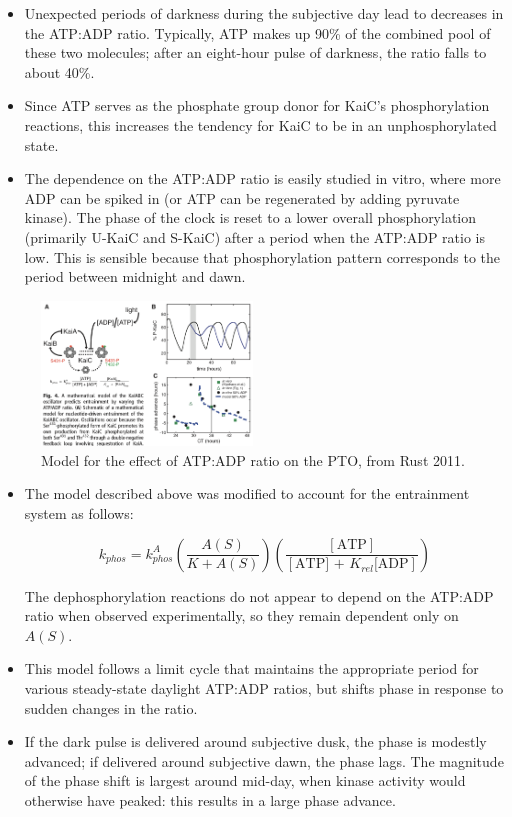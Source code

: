 \documentclass{article}
\begin{document}
\begin{itemize}
\item Unexpected periods of darkness during the subjective day lead to decreases in the ATP:ADP ratio. Typically, ATP makes up 90\% of the combined pool of these two molecules; after an eight-hour pulse of darkness, the ratio falls to about 40\%.

\item Since ATP serves as the phosphate group donor for KaiC's phosphorylation reactions, this increases the tendency for KaiC to be in an unphosphorylated state.

\item The dependence on the ATP:ADP ratio is easily studied in vitro, where more ADP can be spiked in (or ATP can be regenerated by adding pyruvate kinase). The phase of the clock is reset to a lower overall phosphorylation (primarily U-KaiC and S-KaiC) after a period when the ATP:ADP ratio is low. This is sensible because that phosphorylation pattern corresponds to the period between midnight and dawn.

\end{itemize}
\begin{figure}
\begin{center}
\includegraphics[width=0.5\textwidth]{adp_feedback.png}
\caption{Model for the effect of ATP:ADP ratio on the PTO, from Rust 2011.}
\end{center}
\end{figure}
\begin{itemize}

\item The model described above was modified to account for the entrainment system as follows:

\[k_{phos} = k_{phos}^A \left( \frac{A(S)}{K + A(S)} \right) \left( \frac{[\textrm{ATP}]}{[\textrm{ATP] + $K_{rel}$[ADP}]} \right) \]

The dephosphorylation reactions do not appear to depend on the ATP:ADP ratio when observed experimentally, so they remain dependent only on $A(S)$.

\item This model follows a limit cycle that maintains the appropriate period for various steady-state daylight ATP:ADP ratios, but shifts phase in response to sudden changes in the ratio.

\item If the dark pulse is delivered around subjective dusk, the phase is modestly advanced; if delivered around subjective dawn, the phase lags. The magnitude of the phase shift is largest around mid-day, when kinase activity would otherwise have peaked: this results in a large phase advance.
\end{itemize}
\end{document}
